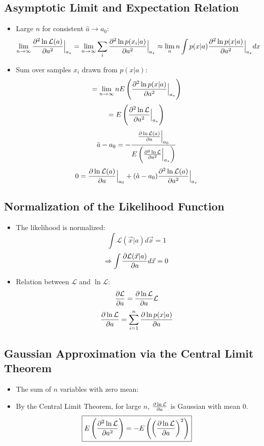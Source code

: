 \subsection{Asymptotic Limit and Expectation Relation}

\begin{itemize}
    \item Large $n$ for consistent $\hat{a} \to a_0$:
          \[ \lim_{n \to \infty} \pdv[2]{\ln \mathcal{L}(a)}{a} \Big|_{a_{\star}} = \lim_{n \to \infty} \sum_i \pdv[2]{\ln p(x_i|a)}{a} \Big|_{a_{\star}} \approx \lim_{n} n \int p(x|a) \pdv[2]{\ln p(x|a)}{a} \Big|_{a_{\star}} dx \]
    \item Sum over samples $x_i$ drawn from $p(x|a)$:
          \[ = \lim_{n \to \infty} n E\left( \pdv[2]{\ln p(x|a)}{a} \Big|_{a_{\star}} \right) \]
          \[ = E \left( \pdv[2]{\ln \mathcal{L}}{a} \Big|_{a_{\star}} \right) \]
          \[ \hat{a} - a_0 = - \frac{\pdv{\ln \mathcal{L}(a)}{a} \Big|_{a_0}}{E\left( \pdv[2]{\ln \mathcal{L}}{a} \Big|_{a_{\star}} \right)} \]
          \[ 0 = \pdv{\ln \mathcal{L}(a)}{a} \Big|_{a_0} + (\hat{a} - a_0) \pdv[2]{\ln \mathcal{L}(a)}{a} \Big|_{a_{\star}} \]
\end{itemize}

\subsection{Normalization of the Likelihood Function}

\begin{itemize}
    \item The likelihood is normalized:
          \[ \int \mathcal{L}(\vec{x}|a) d\vec{x} = 1 \]
          \[ \Rightarrow \int \pdv{\mathcal{L}(\vec{x}|a)}{a} d\vec{x} = 0 \]
    \item Relation between $\mathcal{L}$ and $\ln \mathcal{L}$:
          \[ \pdv{\mathcal{L}}{a} = \pdv{\ln \mathcal{L}}{a} \mathcal{L} \]
          \[ \pdv{\ln \mathcal{L}}{a} = \sum_{i=1}^{n} \pdv{\ln p(x|a)}{a} \]
\end{itemize}

\subsection{Gaussian Approximation via the Central Limit Theorem}

\begin{itemize}
    \item The sum of $n$ variables with zero mean:
    \item By the Central Limit Theorem, for large $n$, $\pdv{\ln \mathcal{L}}{a}$ is Gaussian with mean 0.
          \[ \boxed{E\left(\pdv[2]{\ln \mathcal{L}}{a} \right) = - E \left( \left( \pdv{\ln \mathcal{L}}{a} \right)^2 \right) } \]
\end{itemize}

